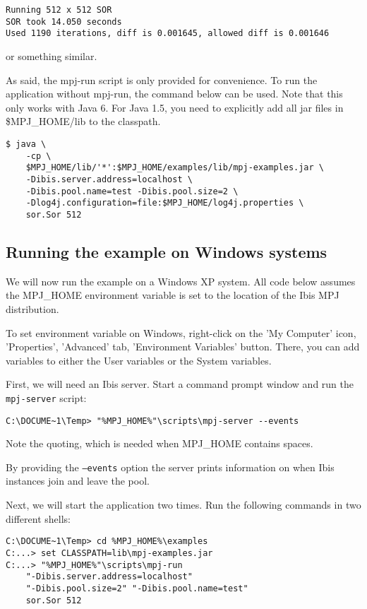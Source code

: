 \documentclass[a4paper,10pt]{article}
\begin{document}
\noindent
{\small
\begin{verbatim}
Running 512 x 512 SOR
SOR took 14.050 seconds
Used 1190 iterations, diff is 0.001645, allowed diff is 0.001646
\end{verbatim}
}
\noindent

or something similar.

As said, the mpj-run script is only provided for convenience. To run
the application without mpj-run, the command below can be used.
Note that this only works with Java 6. For Java 1.5, you need to
explicitly add all jar files in \$MPJ\_HOME/lib to the classpath.

\noindent
{\small
\begin{verbatim}
$ java \
    -cp \
    $MPJ_HOME/lib/'*':$MPJ_HOME/examples/lib/mpj-examples.jar \
    -Dibis.server.address=localhost \
    -Dibis.pool.name=test -Dibis.pool.size=2 \
    -Dlog4j.configuration=file:$MPJ_HOME/log4j.properties \
    sor.Sor 512
\end{verbatim}
}
\noindent

\subsection{Running the example on Windows systems}

We will now run the example on a Windows XP system.
All code below assumes the MPJ\_HOME
environment variable is set to the location of the Ibis MPJ distribution.

To set environment variable on Windows, right-click on the 'My Computer' icon,
'Properties', 'Advanced' tab, 'Environment Variables' button. There, you
can add variables to either the User variables or the System variables.

First, we will need an Ibis server. Start a command prompt window and
run the \texttt{mpj-server} script:
\noindent
{\small
\begin{verbatim}
C:\DOCUME~1\Temp> "%MPJ_HOME%"\scripts\mpj-server --events
\end{verbatim}
}
\noindent

Note the quoting, which is needed when MPJ\_HOME contains spaces.

By providing the \texttt{--events} option the server
prints information on when Ibis instances join and leave the pool.

Next, we will start the application two times.
Run the following commands in two different shells:

\noindent
{\small
\begin{verbatim}
C:\DOCUME~1\Temp> cd %MPJ_HOME%\examples
C:...> set CLASSPATH=lib\mpj-examples.jar
C:...> "%MPJ_HOME%"\scripts\mpj-run
    "-Dibis.server.address=localhost"
    "-Dibis.pool.size=2" "-Dibis.pool.name=test"
    sor.Sor 512
\end{verbatim}
}
\noindent
\end{document}
